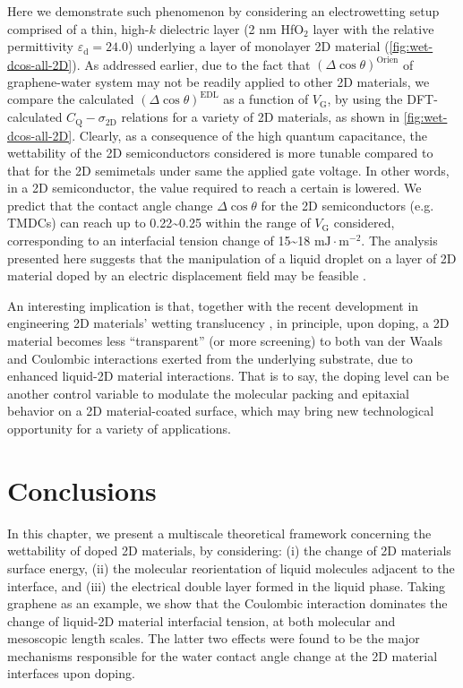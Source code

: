 Here we demonstrate such phenomenon by considering an electrowetting
setup comprised of a thin, high-\(k\) dielectric layer (2 nm
HfO\(_{\text{2}}\) layer with the relative permittivity
\(\varepsilon_{\mathrm{d}}=24.0\)) underlying a layer of monolayer 2D
material (\autoref{fig:wet-dcos-all-2D}).  As addressed earlier, due
to the fact that \((\Delta \cos \theta)^{\mathrm{Orien}}\) of
graphene-water system may not be readily applied to other 2D
materials, we compare the calculated
\((\Delta \cos \theta)^{\mathrm{EDL}}\) as a function of
\(V_{\mathrm{G}}\), by using the DFT-calculated
\(C_{\mathrm{Q}} - \sigma_{\mathrm{2D}}\) relations for a variety of
2D materials, as shown in \autoref{fig:wet-dcos-all-2D}. Clearly, as a
consequence of the high quantum capacitance, the wettability of the 2D
semiconductors considered is more tunable compared to that for the 2D
semimetals under same the applied gate voltage. In other words, in a 2D
semiconductor, the value required to reach a certain is lowered. We
predict that the contact angle change \(\Delta \cos \theta\) for the
2D semiconductors (e.g. TMDCs) can reach up to
0.22\textasciitilde{}0.25 within the range of \(V_{\mathrm{G}}\)
considered, corresponding to an interfacial tension change of
15\textasciitilde{}18 \(\mathrm{mJ} \cdot \mathrm{m}^{-2}\). The
analysis presented here suggests that the manipulation of a liquid
droplet on a layer of 2D material doped by an electric displacement
field may be feasible \cite{Mugele_2005_EW_rev,Hayes_2003_nature_EWOD}.

An interesting implication is that, together with the recent
development in engineering 2D materials’ wetting translucency
\cite{Raj_2013_wetting_rev,rafiee_2012_transparency,Shih_2012_prl,shih_2013_wetting_natmat},
in principle, upon doping, a 2D material becomes less “transparent” (or more screening)
to both van der Waals and Coulombic interactions exerted from the underlying
substrate, due to enhanced liquid-2D material interactions. That is to say, the doping level can be
another control variable to modulate the molecular packing and
epitaxial behavior on a 2D material-coated surface, which may bring
new technological opportunity for a variety of applications.


\section{Conclusions}
\label{sec:wet-conclusions}

In this chapter, we present a multiscale theoretical framework
concerning the wettability of doped 2D materials, by considering: (i)
the change of 2D materials surface energy, (ii) the molecular
reorientation of liquid molecules adjacent to the interface, and (iii)
the electrical double layer formed in the liquid phase. Taking
graphene as an example, we show that the Coulombic interaction
dominates the change of liquid-2D material interfacial tension, at
both molecular and mesoscopic length scales. The latter two effects were
found to be the major mechanisms responsible for the water contact angle
change at the 2D material interfaces upon doping.

